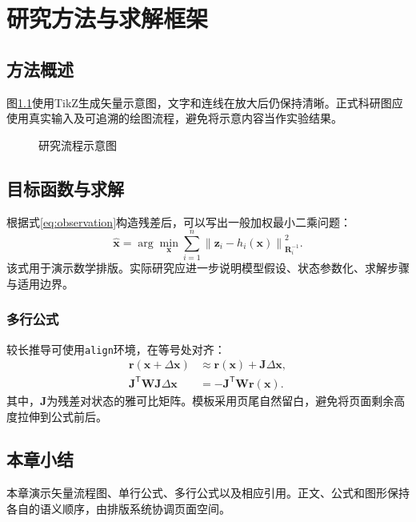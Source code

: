 \chapter{研究方法与求解框架}\label{chap:method}
\section{方法概述}
图\ref{fig:workflow}使用TikZ生成矢量示意图，文字和连线在放大后仍保持清晰。正式科研图应使用真实输入及可追溯的绘图流程，避免将示意内容当作实验结果。

\begin{figure}[htbp]
  \centering
  \caption{研究流程示意图}\label{fig:workflow}
\end{figure}

\section{目标函数与求解}
根据式\eqref{eq:observation}构造残差后，可以写出一般加权最小二乘问题：
\begin{equation}\label{eq:objective}
  \hat{\mathbf{x}}
  =\arg\min_{\mathbf{x}}\sum_{i=1}^{n}
  \left\lVert\mathbf{z}_i-h_i(\mathbf{x})\right\rVert_{\mathbf{R}_i^{-1}}^2.
\end{equation}
该式用于演示数学排版。实际研究应进一步说明模型假设、状态参数化、求解步骤与适用边界。

\subsection{多行公式}
较长推导可使用\texttt{align}环境，在等号处对齐：
\begin{align}
  \mathbf{r}(\mathbf{x}+\Delta\mathbf{x})
    &\approx\mathbf{r}(\mathbf{x})+\mathbf{J}\Delta\mathbf{x},\\
  \mathbf{J}^{\mathsf T}\mathbf{W}\mathbf{J}\Delta\mathbf{x}
    &=-\mathbf{J}^{\mathsf T}\mathbf{W}\mathbf{r}(\mathbf{x}).
\end{align}
其中，$\mathbf{J}$为残差对状态的雅可比矩阵。模板采用页尾自然留白，避免将页面剩余高度拉伸到公式前后。

\section{本章小结}
本章演示矢量流程图、单行公式、多行公式以及相应引用。正文、公式和图形保持各自的语义顺序，由排版系统协调页面空间。

